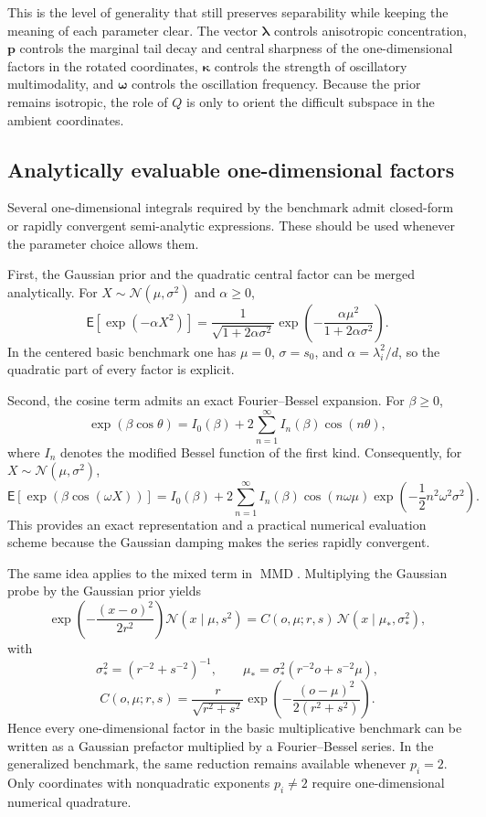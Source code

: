 \documentclass[11pt,a4paper]{article}
\def \E{{\mathsf E}}
\newcommand{\symbfit}[1]{\bm{#1}}
\newcommand{\vc}[1]{{\symbfit{#1}}}
\DeclareMathOperator{\MMDop}{MMD}
\newcommand{\MMD}{\ensuremath{\MMDop}\xspace}
\begin{document}
This is the level of generality that still preserves separability while keeping the meaning of each parameter clear. The vector $\vc\lambda$ controls anisotropic concentration, $\vc p$ controls the marginal tail decay and central sharpness of the one-dimensional factors in the rotated coordinates, $\vc\kappa$ controls the strength of oscillatory multimodality, and $\vc\omega$ controls the oscillation frequency. Because the prior remains isotropic, the role of $Q$ is only to orient the difficult subspace in the ambient coordinates.

\subsection{Analytically evaluable one-dimensional factors}

Several one-dimensional integrals required by the benchmark admit closed-form or rapidly convergent semi-analytic expressions. These should be used whenever the parameter choice allows them.

First, the Gaussian prior and the quadratic central factor can be merged analytically. For $X \sim \mathcal{N}(\mu,\sigma^2)$ and $\alpha \ge 0$,
\[
\E\!\left[\exp\!\left(-\alpha X^2\right)\right]
=
\frac{1}{\sqrt{1+2\alpha \sigma^2}}
\exp\!\left(
-\frac{\alpha \mu^2}{1+2\alpha \sigma^2}
\right).
\]
In the centered basic benchmark one has $\mu=0$, $\sigma=s_0$, and $\alpha=\lambda_i^2/d$, so the quadratic part of every factor is explicit.

Second, the cosine term admits an exact Fourier--Bessel expansion. For $\beta \ge 0$,
\[
\exp\!\left(\beta \cos \theta\right)
=
I_0(\beta) + 2\sum_{n=1}^{\infty} I_n(\beta)\cos(n\theta),
\]
where $I_n$ denotes the modified Bessel function of the first kind. Consequently, for $X \sim \mathcal{N}(\mu,\sigma^2)$,
\[
\E\!\left[\exp\!\left(\beta \cos(\omega X)\right)\right]
=
I_0(\beta)
+ 2\sum_{n=1}^{\infty}
I_n(\beta)
\cos(n\omega \mu)
\exp\!\left(-\frac{1}{2}n^2\omega^2\sigma^2\right).
\]
This provides an exact representation and a practical numerical evaluation scheme because the Gaussian damping makes the series rapidly convergent.

The same idea applies to the mixed term in \MMD. Multiplying the Gaussian probe by the Gaussian prior yields
\[
\exp\!\left(-\frac{(x-o)^2}{2r^2}\right)\mathcal{N}(x\mid \mu,s^2)
=
C(o,\mu;r,s)\,\mathcal{N}(x\mid \mu_\ast,\sigma_\ast^2),
\]
with
\[
\sigma_\ast^2 = \left(r^{-2}+s^{-2}\right)^{-1},
\qquad
\mu_\ast = \sigma_\ast^2\left(r^{-2}o+s^{-2}\mu\right),
\]
\[
C(o,\mu;r,s)
=
\frac{r}{\sqrt{r^2+s^2}}
\exp\!\left(-\frac{(o-\mu)^2}{2(r^2+s^2)}\right).
\]
Hence every one-dimensional factor in the basic multiplicative benchmark can be written as a Gaussian prefactor multiplied by a Fourier--Bessel series. In the generalized benchmark, the same reduction remains available whenever $p_i=2$. Only coordinates with nonquadratic exponents $p_i \neq 2$ require one-dimensional numerical quadrature.
\end{document}
